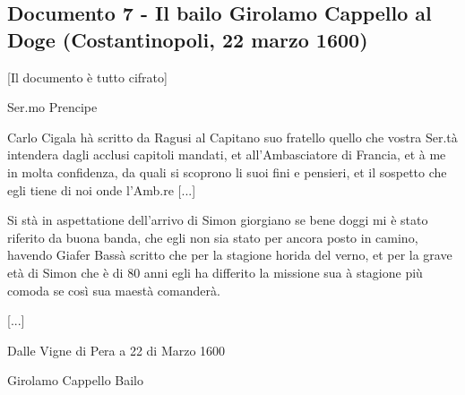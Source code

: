 \subsection{Documento 7 - Il bailo Girolamo Cappello al Doge (Costantinopoli, 22 marzo 1600)}

[Il documento è tutto cifrato]

\begin{center}
Ser.mo Prencipe
\end{center}

Carlo Cigala hà scritto da  Ragusi al Capitano suo fratello quello che
vostra   Ser.tà   intendera  dagli   acclusi   capitoli  mandati,   et
all'Ambasciatore di Francia, et à  me in molta confidenza, da quali si
scoprono li suoi fini e pensieri, et il sospetto che egli tiene di noi
onde l'Amb.re [...]

Si stà in aspettatione dell'arrivo di Simon giorgiano se bene doggi mi
è stato  riferito da buona  banda, che egli  non sia stato  per ancora
posto  in camino,  havendo Giafer  Bassà scritto  che per  la stagione
horida del verno, et  per la grave età di Simon che  è di 80 anni egli
ha differito la missione sua à  stagione più comoda se così sua maestà
comanderà.

[...]

Dalle Vigne di Pera a 22 di Marzo 1600

\begin{raggedright}
Girolamo Cappello Bailo
\end{raggedright}


